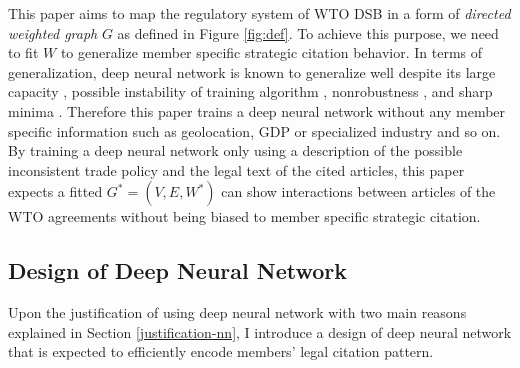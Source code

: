 \documentclass[12pt,letterpaper]{article}
\begin{document}
This paper aims to map the regulatory system of WTO DSB in a form of \textit{directed weighted graph} $G$ as defined in Figure \ref{fig:def}.
To achieve this purpose, we need to fit $W$ to generalize member specific strategic citation behavior.
In terms of generalization, deep neural network is known to generalize well despite
its large capacity \citep{neyshabur2017exploring}, possible instability of training algorithm \citep{charles2017stability}, nonrobustness \citep{zahavy2017ensemble}, and sharp minima \citep{dinh2017sharp}.
Therefore this paper trains a deep neural network without any member specific information such as geolocation, GDP or specialized industry and so on. By training a deep neural network only using a description of the possible inconsistent trade policy and the legal text of the cited articles,
this paper expects a fitted $G^{*} = (V, E, W^*)$ can show interactions between articles of the WTO agreements
without being biased to member specific strategic citation.

\subsection{Design of Deep Neural Network}\label{subsec:design:dnn}
Upon the justification of using deep neural network with two main reasons explained in Section \ref{justification-nn}, %
I introduce a design of deep neural network that is expected to efficiently encode members' legal citation pattern.





\end{document}
